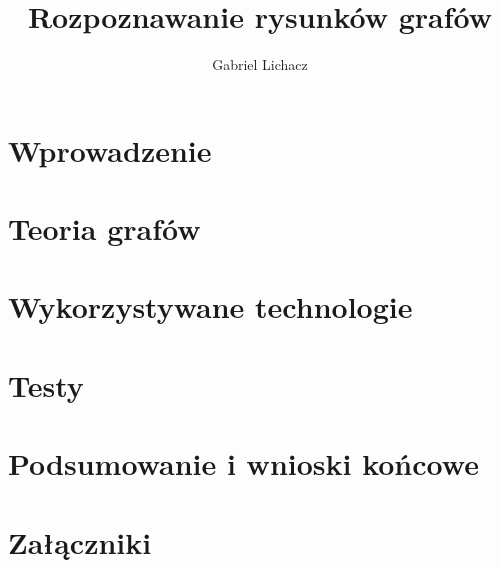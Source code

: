 \documentclass[12pt,twoside]{article}
\author{Gabriel Lichacz}
\title{Rozpoznawanie rysunków grafów}
\begin{document}
\maketitle

\blankpage

\tableofcontents

\clearpage
\blankpage
\clearpage

\section{Wprowadzenie}


\section{Teoria grafów}


\section{Wykorzystywane technologie}


\section{Testy}


\section{Podsumowanie i wnioski końcowe}


\clearpage

\section*{Załączniki}


\clearpage



\clearpage

\makesummary
\end{document}
